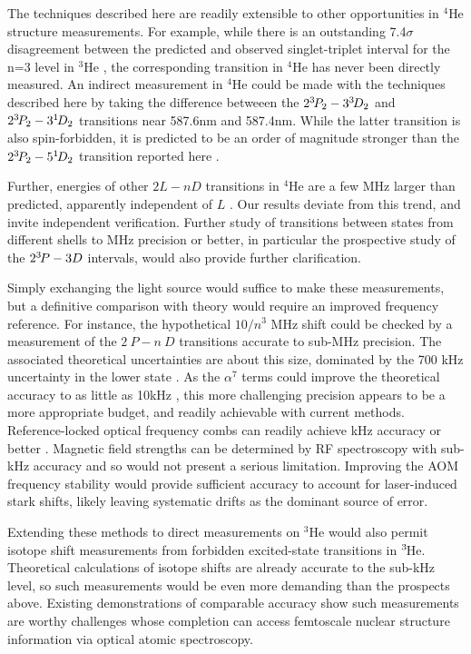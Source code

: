 The techniques described here are readily extensible to other opportunities in $^4$He structure measurements.
	For example, while there is an outstanding 7.4$\sigma$ disagreement between the predicted and observed singlet-triplet interval for the n=3 level in $^3$He \cite{Morton06,Derouard80}, the corresponding transition in $^4$He has never been directly measured.
	An indirect measurement in $^4$He could be made with the techniques described here by taking the difference betweeen the $2^{3\!} P_2 - 3^{3\!} D_2$ and $2^{3\!} P_2 - 3^{1\!} D_2$ transitions near 587.6nm and 587.4nm.
	While the latter transition is also spin-forbidden, it is predicted to be an order of magnitude stronger than the $2^{3\!} P_2 - 5^{1\!} D_2$ transition reported here \cite{Morton06}.

{Further, energies of other $2L-nD$ transitions in $^4$He are a few MHz larger than predicted, apparently independent of $L$ \cite{Wienczek19,Yerokhin20}.
	Our results deviate from this trend, and invite independent verification.
	Further study of transitions between states from different shells to MHz precision or better, in particular the prospective study of the $2^{3\!} P - 3 D$ intervals, would also provide further clarification.}

Simply exchanging the light source would suffice to make these measurements, but a definitive comparison with theory would require an improved frequency reference.
	For instance, the hypothetical $10/n^3$ MHz shift could be checked by a measurement of the $2~P-n~D$ transitions accurate to sub-MHz precision.
	The associated theoretical uncertainties are about this size, dominated by the 700 kHz uncertainty in the lower state \cite{Pachucki17,Wienczek19}.
	As the $\alpha^7$ terms could improve the theoretical accuracy to as little as 10kHz \cite{Pachucki17}, this more challenging precision appears to be a more appropriate budget, and readily achievable with current methods.
	Reference-locked optical frequency combs can readily achieve kHz accuracy or better \cite{Luo15,Rengelink18}.
	Magnetic field strengths can be determined by RF spectroscopy with sub-kHz accuracy and so would not present a serious limitation.
	Improving the AOM frequency stability would provide sufficient accuracy to account for laser-induced stark shifts, likely leaving systematic drifts as the dominant source of error.

Extending these methods to direct measurements on $^3$He would also permit isotope shift measurements from forbidden excited-state transitions in $^{3\!}$He.
	Theoretical calculations of isotope shifts are already accurate to the sub-kHz level, so such measurements would be even more demanding than the prospects above.
	Existing demonstrations of comparable accuracy \cite{Rengelink18} show such measurements are worthy challenges whose completion can access femtoscale nuclear structure information via optical atomic spectroscopy.



